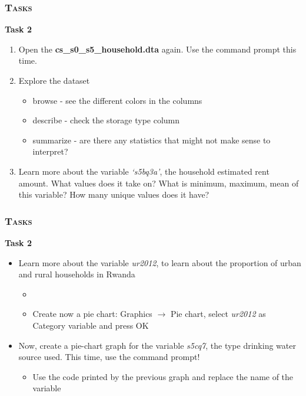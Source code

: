 \documentclass[10pt]{beamer}
\begin{document}
	\begin{frame}
		\frametitle{\textsc{Tasks}}
		\begin{center}
			\Large\textbf{Task 2}
		\end{center}
		\begin{enumerate}
			\item Open the \textbf{cs\_s0\_s5\_household.dta} again. Use the command prompt this time.
			\item Explore the dataset
			\begin{itemize}
				\item browse - see the different colors in the columns
				\item describe - check the storage type column
				\item summarize - are there any statistics that might not make sense to interpret?
			\end{itemize}
			\item Learn more about the variable \textit{‘s5bq3a’}, the household estimated rent amount. What values does it take on? What is minimum, maximum, mean of this variable? How many unique values does it have?
		\end{enumerate}
		
\begin{stlog}\end{stlog}
		\end{frame}

	\begin{frame}
		\frametitle{\textsc{Tasks}}
		\begin{center}
			\Large\textbf{Task 2}
		\end{center}
		\begin{itemize}
			\item Learn more about the variable \textit{ur2012}, to learn about the proportion of urban and rural households in Rwanda
		\begin{itemize}
				\item
			
\begin{stlog}\end{stlog}
				\item Create now a pie chart: Graphics $\rightarrow$ Pie chart, select \textit{ur2012} as Category variable and press OK
			\end{itemize}
		\item Now, create a pie-chart graph for the variable \textit{s5cq7}, the type drinking water source used. This time, use the command prompt!
			\begin{itemize}
				\item Use the code printed by the previous graph and replace the name of the variable
			\end{itemize}

		\end{itemize}
	\end{frame}
\end{document}
